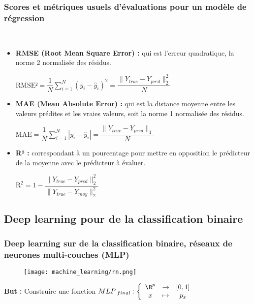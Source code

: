 \documentclass{beamer}
\theoremstyle{definition}
\begin{document}
\begin{frame}
	\frametitle{Scores et métriques usuels d'évaluations pour un modèle de régression}
	
	\hfill\\[-1cm]
	\begin{minipage}[t]{1\linewidth}
		\begin{itemize}
			\item \textbf{RMSE (Root Mean Square Error) :} qui est l'erreur quadratique, la norme 2 normalisée des résidus.
			
			\begin{center}
				$\text{RMSE²} = \displaystyle\dfrac{1}{N} \sum_{i=1}^{N} (y_i - \hat{y}_i)^2 = \dfrac{\|Y_{true} - Y_{pred}\|_2^2}{N}  $
			\end{center}
			
			\item \textbf{MAE (Mean Absolute Error) :} qui est la distance moyenne entre les valeurs prédites et les vraies valeurs, soit la norme 1 normalisée des résidus.
			\begin{center}
				$ \displaystyle \text{MAE} = \dfrac{1}{N} \sum_{i=1}^{N} |y_i - \hat{y}_i|  = \dfrac{\|Y_{true} - Y_{pred}\|_1}{N} $
			\end{center}
			
			\item \textbf{R² :} correspondant à un pourcentage pour mettre en opposition le prédicteur de la moyenne avec le prédicteur à évaluer. 
			\begin{center}
				$ \text{R}^2 = 1 - \dfrac{\|Y_{true} - Y_{pred}\|_2^2}{\|Y_{true} - Y_{moy}\|_2^2} $
			\end{center}		
		\end{itemize}	
	\end{minipage}	
\end{frame}

\subsection{Deep learning pour de la classification binaire}

\begin{frame}
	\frametitle{Deep learning sur de la classification binaire, réseaux de neurones multi-couches (MLP)}
			\centering
			\begin{figure}
				\texttt{[image: machine\_learning/rn.png]}
			\end{figure}
			
	\textbf{But :} Construire une fonction $
		MLP_{~final} : \left\{\begin{array}{ccc}
			\R^p &\to &[0,1]\\
			x &\mapsto &p_x
	\end{array}\right.$

\end{frame}
\end{document}
